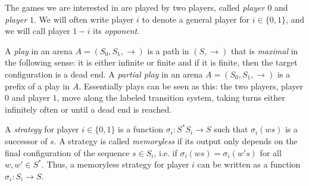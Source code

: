 \documentclass[a4paper,UKenglish,cleveref, autoref, thm-restate]{lipics-v2021}
\newcommand\mh[1]{\todo[inline,size=\scriptsize]{#1 - \textbf{Mathieu}}}
\begin{document}

\noindent
The games we are interested in are played by two players, called {\em player $0$} and {\em player $1$}. We will often write player $i$ to denote a general player for $i \in \{0,1 \}$,
and we will call player $1-i$ its {\em opponent}. 

\noindent
A {\em play} in an arena $A=(S_0,S_1,\rightarrow)$ is a path in $(S,{\rightarrow})$ that is {\em maximal} in the following sense: it is either infinite or finite and if it is finite, then the target configuration is a dead end. 
A {\em partial play} in an arena $A=(S_0,S_1,\rightarrow)$ is a 
prefix of a play in $A$.
Essentially plays can be seen as this: the two players, player $0$ and player $1$, move along the labeled transition system, taking turns either inﬁnitely often or until a dead end is reached.




A {\em strategy} for player $i \in \{ 0,1\}$ is a function $\sigma_i : S^* S_i \to S$ such
that $\sigma_i(ws)$ is a successor of $s$.
%
A strategy is called {\em memoryless} if its output only depends on the final configuration of the sequence $s \in S_i$, i.e. if $\sigma_i(ws) = \sigma_i(w's)$ for all $w,w' \in S^*$. Thus, a memoryless strategy for player $i$ can be written  as a function $\sigma_i: S_i \to S$.
\end{document}
